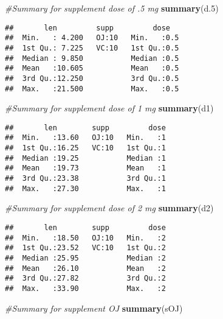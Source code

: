 \documentclass[]{article}
\newenvironment{Shaded}{\begin{snugshade}}{\end{snugshade}}
\newcommand{\KeywordTok}[1]{\textcolor[rgb]{0.13,0.29,0.53}{\textbf{#1}}}
\newcommand{\DecValTok}[1]{\textcolor[rgb]{0.00,0.00,0.81}{#1}}
\newcommand{\CommentTok}[1]{\textcolor[rgb]{0.56,0.35,0.01}{\textit{#1}}}
\newcommand{\NormalTok}[1]{#1}
\begin{document}
\begin{Shaded}
\begin{Highlighting}[]
\CommentTok{#Summary for supplement dose of .5 mg}
\KeywordTok{summary}\NormalTok{(d.}\DecValTok{5}\NormalTok{)}
\end{Highlighting}
\end{Shaded}

\begin{verbatim}
##       len         supp         dose    
##  Min.   : 4.200   OJ:10   Min.   :0.5  
##  1st Qu.: 7.225   VC:10   1st Qu.:0.5  
##  Median : 9.850           Median :0.5  
##  Mean   :10.605           Mean   :0.5  
##  3rd Qu.:12.250           3rd Qu.:0.5  
##  Max.   :21.500           Max.   :0.5
\end{verbatim}

\begin{Shaded}
\begin{Highlighting}[]
\CommentTok{#Summary for supplement dose of 1 mg}
\KeywordTok{summary}\NormalTok{(d1)}
\end{Highlighting}
\end{Shaded}

\begin{verbatim}
##       len        supp         dose  
##  Min.   :13.60   OJ:10   Min.   :1  
##  1st Qu.:16.25   VC:10   1st Qu.:1  
##  Median :19.25           Median :1  
##  Mean   :19.73           Mean   :1  
##  3rd Qu.:23.38           3rd Qu.:1  
##  Max.   :27.30           Max.   :1
\end{verbatim}

\begin{Shaded}
\begin{Highlighting}[]
\CommentTok{#Summary for supplement dose of 2 mg}
\KeywordTok{summary}\NormalTok{(d2)}
\end{Highlighting}
\end{Shaded}

\begin{verbatim}
##       len        supp         dose  
##  Min.   :18.50   OJ:10   Min.   :2  
##  1st Qu.:23.52   VC:10   1st Qu.:2  
##  Median :25.95           Median :2  
##  Mean   :26.10           Mean   :2  
##  3rd Qu.:27.82           3rd Qu.:2  
##  Max.   :33.90           Max.   :2
\end{verbatim}

\begin{Shaded}
\begin{Highlighting}[]
\CommentTok{#Summary for supplement OJ}
\KeywordTok{summary}\NormalTok{(sOJ)}
\end{Highlighting}
\end{Shaded}
\end{document}
